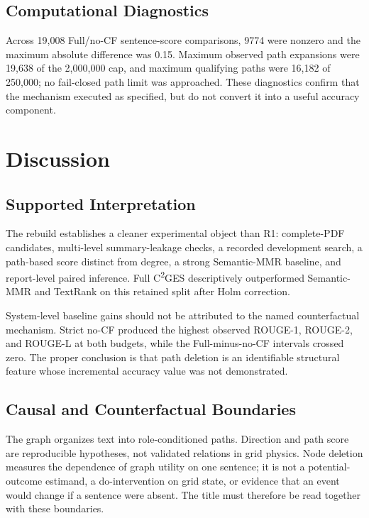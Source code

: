 \documentclass[applsci,article,submit,moreauthors]{Definitions/mdpi}
\newcommand{\cges}{C\textsuperscript{2}GES}
\begin{document}
\subsection{Computational Diagnostics}

Across 19,008 Full/no-CF sentence-score comparisons, 9774 were nonzero and the maximum absolute difference was 0.15. Maximum observed path expansions were 19,638 of the 2,000,000 cap, and maximum qualifying paths were 16,182 of 250,000; no fail-closed path limit was approached. These diagnostics confirm that the mechanism executed as specified, but do not convert it into a useful accuracy component.

\section{Discussion}

\subsection{Supported Interpretation}

The rebuild establishes a cleaner experimental object than R1: complete-PDF candidates, multi-level summary-leakage checks, a recorded development search, a path-based score distinct from degree, a strong Semantic-MMR baseline, and report-level paired inference. Full \cges{} descriptively outperformed Semantic-MMR and TextRank on this retained split after Holm correction.

System-level baseline gains should not be attributed to the named counterfactual mechanism. Strict no-CF produced the highest observed ROUGE-1, ROUGE-2, and ROUGE-L at both budgets, while the Full-minus-no-CF intervals crossed zero. The proper conclusion is that path deletion is an identifiable structural feature whose incremental accuracy value was not demonstrated.

\subsection{Causal and Counterfactual Boundaries}

The graph organizes text into role-conditioned paths. Direction and path score are reproducible hypotheses, not validated relations in grid physics. Node deletion measures the dependence of graph utility on one sentence; it is not a potential-outcome estimand, a do-intervention on grid state, or evidence that an event would change if a sentence were absent. The title must therefore be read together with these boundaries.
\end{document}
